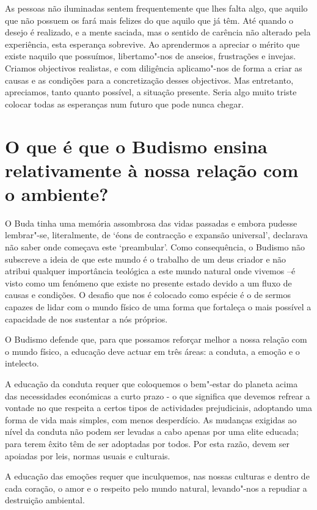 As pessoas não iluminadas sentem frequentemente que lhes falta algo, que
aquilo que não possuem os fará mais felizes do que aquilo que já têm.
Até quando o desejo é realizado, e a mente saciada, mas o sentido de
carência não alterado pela experiência, esta esperança sobrevive. Ao
aprendermos a apreciar o mérito que existe naquilo que possuímos,
libertamo"-nos de anseios, frustrações e invejas. Criamos objectivos
realistas, e com diligência aplicamo"-nos de forma a criar as causas e as
condições para a concretização desses objectivos. Mas entretanto,
apreciamos, tanto quanto possível, a situação presente. Seria algo muito
triste colocar todas as esperanças num futuro que pode nunca chegar.

\section{O que é que o Budismo ensina relativamente à nossa relação com o
  ambiente?}

\enlargethispage{\baselineskip}

O Buda tinha uma memória assombrosa das vidas passadas e embora pudesse
lembrar"-se, literalmente, de `éons de contracção e expansão
universal', declarava não saber onde começava este `preambular'. Como
consequência, o Budismo não subscreve a ideia de que este mundo é o
trabalho de um deus criador e não atribui qualquer importância teológica
a este mundo natural onde vivemos --é visto como um fenómeno que existe
no presente estado devido a um fluxo de causas e condições. O desafio
que nos é colocado como espécie é o de sermos capazes de lidar com o
mundo físico de uma forma que fortaleça o mais possível a capacidade de
nos sustentar a nós próprios.

O Budismo defende que, para que possamos reforçar melhor a nossa relação
com o mundo físico, a educação deve actuar em três áreas: a conduta, a
emoção e o intelecto.

A educação da conduta requer que coloquemos o bem"-estar do planeta acima
das necessidades económicas a curto prazo - o que significa que devemos
refrear a vontade no que respeita a certos tipos de actividades
prejudiciais, adoptando uma forma de vida mais simples, com menos
desperdício. As mudanças exigidas ao nível da conduta não podem ser
levadas a cabo apenas por uma elite educada; para terem êxito têm de ser
adoptadas por todos. Por esta razão, devem ser apoiadas por leis, normas
usuais e culturais.

A educação das emoções requer que inculquemos, nas nossas culturas e
dentro de cada coração, o amor e o respeito pelo mundo natural,
levando"-nos a repudiar a destruição ambiental.

